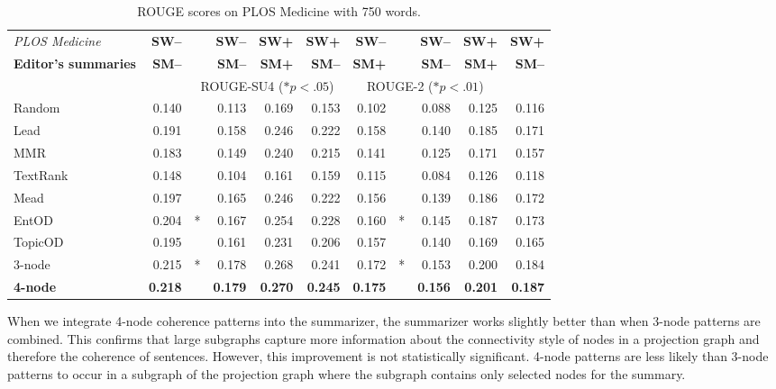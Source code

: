 \begin{table}[!ht]
	\begin{center}
		\begin{tabular}{lr@{}lrrr||r@{}lrrr}
		\toprule
		\emph{PLOS Medicine}& \textbf{SW--}& & \textbf{SW--} & \textbf{SW+} & \textbf{SW+}& \textbf{SW--} & & \textbf{SW--} & \textbf{SW+} & \textbf{SW+} \\
		\textbf{Editor's summaries}  & \textbf{SM--} & & \textbf{SM--} &  \textbf{SM+} & \textbf{SM--} &  \textbf{SM+}  & & \textbf{SM--} &  \textbf{SM+}  & \textbf{SM--} \\
		\midrule
		&& \multicolumn{4}{c||}{ROUGE-SU4 ($\ast p<.05$)} & \multicolumn{4}{c}{ROUGE-2 ($\ast p<.01$)}\\
		\midrule
		Random &  0.140& & 0.113 & 0.169  & 0.153 &  0.102 & & 0.088 & 0.125 & 0.116 \\
		Lead & 0.191 & & 0.158 & 0.246 & 0.222  & 0.158 & & 0.140 &0.185 &0.171   \\
		MMR & 0.183& & 0.149 & 0.240 & 0.215 & 0.141 & & 0.125 & 0.171 &0.157 \\
		TextRank & 0.148& & 0.104 & 0.161 & 0.159 & 0.115 & & 0.084 &0.126 & 0.118\\
		Mead & 0.197 & & 0.165 & 0.246 & 0.222& 0.156 & &0.139 & 0.186 & 0.172 \\
		EntOD & 0.204&* & 0.167 & 0.254& 0.228 &0.160 &* & 0.145 &0.187 & 0.173\\
		TopicOD & 0.195 & &0.161 & 0.231 &0.206 & 0.157 &  & 0.140 &0.169 & 0.165 \\
		3-node &0.215& * &0.178& 0.268& 0.241& 0.172 & * & 0.153 & 0.200 &0.184 \\
		\textbf{4-node} & \textbf{0.218}& & \textbf{0.179} & \textbf{0.270} & \textbf{0.245}  & \textbf{0.175} & & \textbf{0.156} & \textbf{0.201} & \textbf{0.187} \\
		\bottomrule
		\end{tabular}
	\end{center}
	\caption{ROUGE scores on PLOS Medicine with 750 words.}
	\label{tab:plos-750words}
\end{table}
	
When we integrate 4-node coherence patterns into the summarizer, the summarizer works slightly better than when 3-node patterns are combined. 
This confirms that large subgraphs capture more information about the connectivity style of nodes in a projection graph and therefore the coherence of sentences.  
However, this improvement is not statistically significant. 
4-node patterns are less likely than 3-node patterns to occur in a subgraph of the projection graph where the subgraph contains only selected nodes for the summary. 

